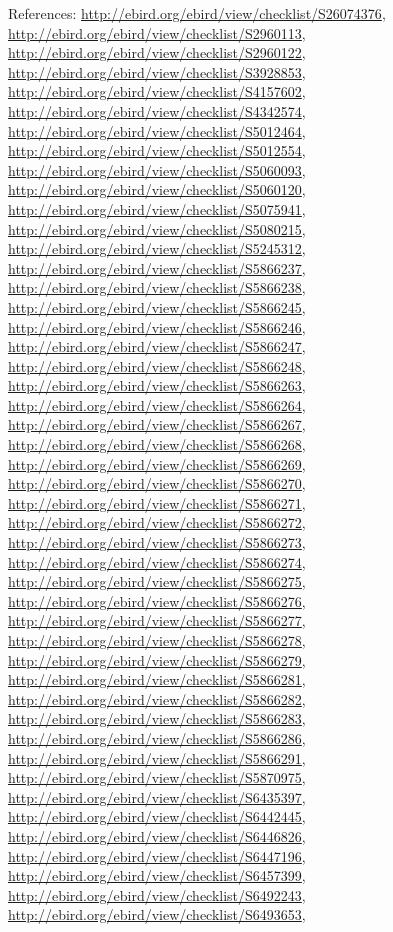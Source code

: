 \documentclass[9pt, article]{memoir}
\begin{document}
\begin{multicols}{2}
\vspace{6pt}References: 
\url{http://ebird.org/ebird/view/checklist/S26074376}, 
\url{http://ebird.org/ebird/view/checklist/S2960113}, 
\url{http://ebird.org/ebird/view/checklist/S2960122}, 
\url{http://ebird.org/ebird/view/checklist/S3928853}, 
\url{http://ebird.org/ebird/view/checklist/S4157602}, 
\url{http://ebird.org/ebird/view/checklist/S4342574}, 
\url{http://ebird.org/ebird/view/checklist/S5012464}, 
\url{http://ebird.org/ebird/view/checklist/S5012554}, 
\url{http://ebird.org/ebird/view/checklist/S5060093}, 
\url{http://ebird.org/ebird/view/checklist/S5060120}, 
\url{http://ebird.org/ebird/view/checklist/S5075941}, 
\url{http://ebird.org/ebird/view/checklist/S5080215}, 
\url{http://ebird.org/ebird/view/checklist/S5245312}, 
\url{http://ebird.org/ebird/view/checklist/S5866237}, 
\url{http://ebird.org/ebird/view/checklist/S5866238}, 
\url{http://ebird.org/ebird/view/checklist/S5866245}, 
\url{http://ebird.org/ebird/view/checklist/S5866246}, 
\url{http://ebird.org/ebird/view/checklist/S5866247}, 
\url{http://ebird.org/ebird/view/checklist/S5866248}, 
\url{http://ebird.org/ebird/view/checklist/S5866263}, 
\url{http://ebird.org/ebird/view/checklist/S5866264}, 
\url{http://ebird.org/ebird/view/checklist/S5866267}, 
\url{http://ebird.org/ebird/view/checklist/S5866268}, 
\url{http://ebird.org/ebird/view/checklist/S5866269}, 
\url{http://ebird.org/ebird/view/checklist/S5866270}, 
\url{http://ebird.org/ebird/view/checklist/S5866271}, 
\url{http://ebird.org/ebird/view/checklist/S5866272}, 
\url{http://ebird.org/ebird/view/checklist/S5866273}, 
\url{http://ebird.org/ebird/view/checklist/S5866274}, 
\url{http://ebird.org/ebird/view/checklist/S5866275}, 
\url{http://ebird.org/ebird/view/checklist/S5866276}, 
\url{http://ebird.org/ebird/view/checklist/S5866277}, 
\url{http://ebird.org/ebird/view/checklist/S5866278}, 
\url{http://ebird.org/ebird/view/checklist/S5866279}, 
\url{http://ebird.org/ebird/view/checklist/S5866281}, 
\url{http://ebird.org/ebird/view/checklist/S5866282}, 
\url{http://ebird.org/ebird/view/checklist/S5866283}, 
\url{http://ebird.org/ebird/view/checklist/S5866286}, 
\url{http://ebird.org/ebird/view/checklist/S5866291}, 
\url{http://ebird.org/ebird/view/checklist/S5870975}, 
\url{http://ebird.org/ebird/view/checklist/S6435397}, 
\url{http://ebird.org/ebird/view/checklist/S6442445}, 
\url{http://ebird.org/ebird/view/checklist/S6446826}, 
\url{http://ebird.org/ebird/view/checklist/S6447196}, 
\url{http://ebird.org/ebird/view/checklist/S6457399}, 
\url{http://ebird.org/ebird/view/checklist/S6492243}, 
\url{http://ebird.org/ebird/view/checklist/S6493653}, 

\end{multicols}
\end{document}
